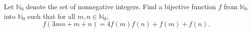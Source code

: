 Let $\mathbb{N}_0$ denote the set of nonnegative integers. Find a bijective function $f$ from $\mathbb{N}_0$ into $\mathbb{N}_0$ such that for all $m, n \in \mathbb{N}_0$,
\[ f(3mn + m + n) = 4f(m)f(n) + f(m) + f(n). \]
